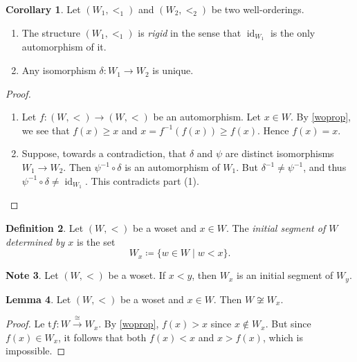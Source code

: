 \documentclass[10pt,letterpaper,cm]{nupset}
\theoremstyle{definition}
\newtheorem{definition}{Definition}[subsection]
\newtheorem{note}[definition]{Note}
\theoremstyle{theorem}
\newtheorem{lemma}[definition]{Lemma}
\newtheorem{corollary}[definition]{Corollary}
\theoremstyle{remark}
\newcommand{\1}{\mathbf{1}}
\newcommand{\0}{\vec 0}
\DeclareMathOperator{\id}{id}
\begin{document}
\begin{corollary} Let $(W_1, <_1)$ and $(W_2, <_2)$ be two well-orderings. 
\begin{enumerate}[label=(\arabic*)]
\item The structure $(W_1, <_1)$ is \textit{rigid} in the sense that $\id_{W_1}$ is the only automorphism of it.
\item Any isomorphism $\delta : W_1 \to W_2$ is unique. 
\end{enumerate}
\end{corollary}
\begin{proof} $ $
\begin{enumerate}[label=(\arabic*)]
\item Let $f: (W, <) \to (W,<)$ be an automorphism.  Let $x\in W$. By \cref{woprop}, we see that $f(x)\geq x$ and $x = f^{-1}(f(x))\geq f(x)$. Hence $f(x) =x$.
\item Suppose, towards a contradiction, that $\delta$ and $\psi$ are distinct isomorphisms $ W_1\to W_2$. Then $\psi^{-1} \circ \delta$ is an automorphism of $W_1$. But $\delta^{-1} \ne \psi^{-1}$, and thus $\psi^{-1} \circ \delta \ne \id_{W_1}$. This contradicts part (1). 
\end{enumerate}
\end{proof}

\begin{definition}
Let $(W, <)$ be a woset and $x\in W$. The \textit{initial segment of $W$ determined by $x$} is the set $$W_x \coloneqq \{ w\in W \mid w<x\}.$$
\end{definition}

\begin{note}
Let $(W, <)$ be a woset. If $x<y$, then $W_x$ is an initial segment of $W_y$.
\end{note}

\begin{lemma}\label{non-iso}
Let $(W, <)$ be a woset and $x\in W$. Then $W\not \cong W_x$.
\end{lemma}
\begin{proof}
Le t$f : W \overset{\cong}{\longrightarrow} W_x$. By \cref{woprop}, $f(x) >x$ since $x\notin W_x$. But since $f(x) \in W_x$, it follows that both $f(x) <x$ and $x>f(x)$, which is impossible. 
\end{proof}
\end{document}
